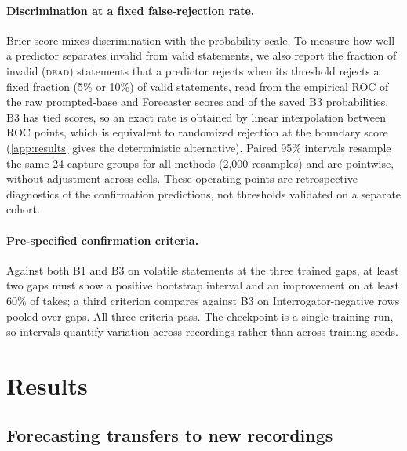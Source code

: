 \documentclass[10pt]{article}
\newcommand{\dead}{\textsc{dead}}
\begin{document}
\paragraph{Discrimination at a fixed false-rejection rate.} Brier score mixes discrimination with the probability scale. To measure how well a predictor separates invalid from valid statements, we also report the fraction of invalid (\dead{}) statements that a predictor rejects when its threshold rejects a fixed fraction (5\% or 10\%) of valid statements, read from the empirical ROC of the raw prompted-base and Forecaster scores and of the saved B3 probabilities. B3 has tied scores, so an exact rate is obtained by linear interpolation between ROC points, which is equivalent to randomized rejection at the boundary score (\cref{app:results} gives the deterministic alternative). Paired 95\% intervals resample the same 24 capture groups for all methods (2,000 resamples) and are pointwise, without adjustment across cells. These operating points are retrospective diagnostics of the confirmation predictions, not thresholds validated on a separate cohort.

\paragraph{Pre-specified confirmation criteria.} Against both B1 and B3 on volatile statements at the three trained gaps, at least two gaps must show a positive bootstrap interval and an improvement on at least 60\% of takes; a third criterion compares against B3 on Interrogator-negative rows pooled over gaps. All three criteria pass. The checkpoint is a single training run, so intervals quantify variation across recordings rather than across training seeds.

\section{Results}
\label{sec:results}

\subsection{Forecasting transfers to new recordings}
\end{document}

